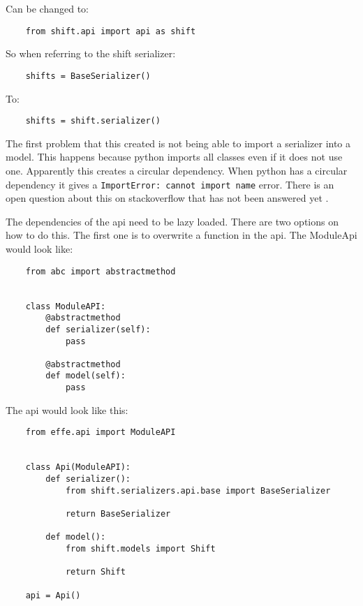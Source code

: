 Can be changed to:
\begin{verbatim}
    from shift.api import api as shift
\end{verbatim}

So when referring to the shift serializer:
\begin{verbatim}
    shifts = BaseSerializer()
\end{verbatim}

To:
\begin{verbatim}
    shifts = shift.serializer()
\end{verbatim}

The first problem that this created is not being able to import a serializer into a model. This happens because python imports all classes even if it does not use one. Apparently this creates a circular dependency. When python has a circular dependency it gives a \texttt{ImportError: cannot import name} error. There is an open question about this on stackoverflow that has not been answered yet \cite{circularDependencyQuestion}.

The dependencies of the api need to be lazy loaded. There are two options on how to do this. The first one is to overwrite a function in the api. The ModuleApi would look like:
\begin{verbatim}
    from abc import abstractmethod


    class ModuleAPI:
        @abstractmethod
        def serializer(self):
            pass

        @abstractmethod
        def model(self):
            pass
\end{verbatim}

The api would look like this:
\begin{verbatim}
    from effe.api import ModuleAPI


    class Api(ModuleAPI):
        def serializer():
            from shift.serializers.api.base import BaseSerializer

            return BaseSerializer

        def model():
            from shift.models import Shift

            return Shift

    api = Api()
\end{verbatim}

